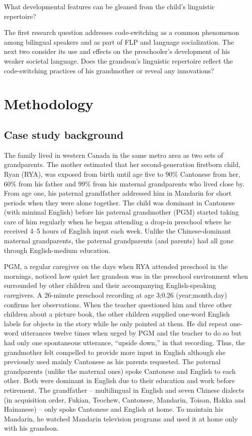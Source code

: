 \documentclass[output=paper,colorlinks,citecolor=brown]{langscibook}
\begin{document}
\ea
What developmental features can be gleaned from the child’s linguistic repertoire? 
\z

The first research question addresses code-switching as a common phenomenon among bilingual speakers and as part of FLP and language socialization. The next two consider its use and effects on the preschooler’s development of his weaker societal language. Does the grandson’s linguistic repertoire reflect the code-switching practices of his grandmother or reveal any innovations? 

\section{Methodology} 

\subsection{Case study background}\label{sec:quay:3.1}

The family lived in western Canada in the same metro area as two sets of grandparents. The mother estimated that her second-generation firstborn child, Ryan (RYA), was exposed from birth until age five to 90\% Cantonese from her, 60\% from his father and 99\% from his maternal grandparents who lived close by. From age one, his paternal grandfather addressed him in Mandarin for short periods when they were alone together. The child was dominant in Cantonese (with minimal English) before his paternal grandmother (PGM) started taking care of him regularly when he began attending a drop-in preschool where he received 4–5 hours of English input each week. Unlike the Chinese-dominant maternal grandparents, the paternal grandparents (and parents) had all gone through English-medium education.

PGM, a regular caregiver on the days when RYA attended preschool in the mornings, noticed how quiet her grandson was in the preschool environment when surrounded by other children and their accompanying English-speaking caregivers. A 26-minute preschool recording at age 3;0.26 (year;month.day) confirms her observations. When the teacher questioned him and three other children about a picture book, the other children supplied one-word English labels for objects in the story while he only pointed at them. He did repeat one-word utterances twelve times when urged by PGM and the teacher to do so but had only one spontaneous utterance, “upside down,” in that recording. Thus, the grandmother felt compelled to provide more input in English although she previously used mainly Cantonese as his parents requested. The paternal grandparents (unlike the maternal ones) spoke Cantonese and English to each other. Both were dominant in English due to their education and work before retirement. The grandfather – multilingual in English and seven Chinese dialects (in acquisition order, Fukian, Teochew, Cantonese, Mandarin, Toisan, Hakka and Hainanese) – only spoke Cantonese and English at home. To maintain his Mandarin, he watched Mandarin television programs and used it at home only with his grandson. 
\end{document}
